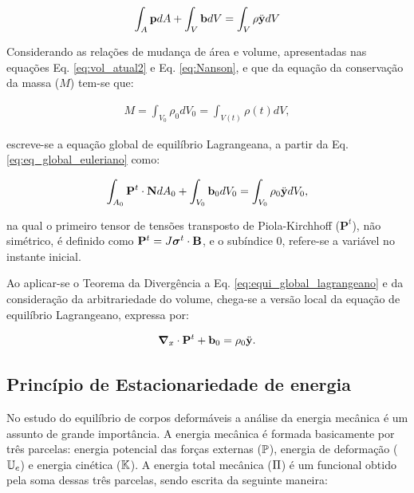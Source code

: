 \documentclass[tese_patricia]{subfiles}
\begin{document}
\begin{align}
	\int_{A} \mathbf{p} dA + \int_{V} \mathbf{b} dV = \int_{V} \rho  \ddot{\mathbf{y}} dV 
\end{align}

Considerando as relações de mudança de área e volume, apresentadas nas equações Eq. \ref{eq:vol_atual2} e Eq. \ref{eq:Nanson}, e que da equação da conservação da massa ($M$) tem-se que:

\begin{align}
	M = \int_{V_{0}} \rho_{0}dV_{0} = \int_{V(t)} \rho(t)dV, \label{eq:conser_massa}
\end{align}

\noindent escreve-se a equação global de equilíbrio Lagrangeana, a partir da Eq. \ref{eq:eq_global_euleriano} como:

\begin{align}
	\int_{A_0} \mathbf{P}^t \cdot \mathbf{N} dA_0 + \int_{V_0} \mathbf{b}_0 dV_0 = \int_{V_0} \rho_0  \ddot{\mathbf{y}} dV_0, \label{eq:equi_global_lagrangeano}
\end{align}

\noindent na qual o primeiro tensor de tensões transposto de Piola-Kirchhoff ($\mathbf{P}^t$), não simétrico, é definido como $\mathbf{P}^t = J \boldsymbol{\sigma}^t \cdot \mathbf{B}$, e o subíndice $0$, refere-se a variável no instante inicial.

Ao aplicar-se o Teorema da Divergência a Eq. \ref{eq:equi_global_lagrangeano} e da consideração da arbitrariedade do volume, chega-se a versão local da equação de equilíbrio Lagrangeano, expressa por:

\begin{align}
	\boldsymbol{\nabla}_x \cdot \mathbf{P}^t +  \mathbf{b}_0 = \rho_0  \ddot{\mathbf{y}}. \label{eq:equi_local_lagrangeano}
\end{align}


\subsection{Princípio de Estacionariedade de energia}

No estudo do equilíbrio de corpos deformáveis a análise da energia mecânica é um assunto de grande importância. A energia mecânica é formada basicamente por três parcelas: energia potencial das forças externas ($\mathbb{P}$), energia de deformação ($\mathbb{U}_e$) e energia cinética ($\mathbb{K}$). A energia total mecânica ($\Pi$) é um funcional obtido pela soma dessas três parcelas, sendo escrita da seguinte maneira:
\end{document}
